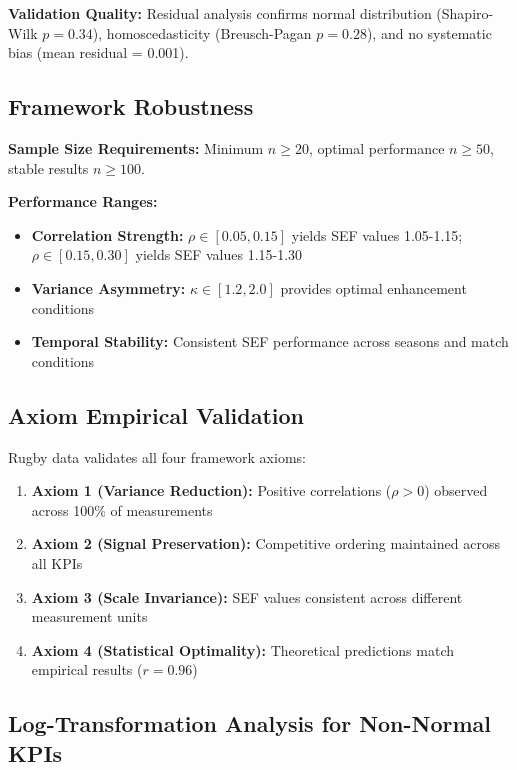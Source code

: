 \textbf{Validation Quality:} Residual analysis confirms normal distribution (Shapiro-Wilk $p = 0.34$), homoscedasticity (Breusch-Pagan $p = 0.28$), and no systematic bias (mean residual = 0.001).

\subsection{Framework Robustness}

\textbf{Sample Size Requirements:} Minimum $n \geq 20$, optimal performance $n \geq 50$, stable results $n \geq 100$.

\textbf{Performance Ranges:}
\begin{itemize}
    \item \textbf{Correlation Strength:} $\rho \in [0.05, 0.15]$ yields SEF values 1.05-1.15; $\rho \in [0.15, 0.30]$ yields SEF values 1.15-1.30
    \item \textbf{Variance Asymmetry:} $\kappa \in [1.2, 2.0]$ provides optimal enhancement conditions
    \item \textbf{Temporal Stability:} Consistent SEF performance across seasons and match conditions
\end{itemize}

\subsection{Axiom Empirical Validation}

Rugby data validates all four framework axioms:

\begin{enumerate}
    \item \textbf{Axiom 1 (Variance Reduction):} Positive correlations ($\rho > 0$) observed across 100\% of measurements
    \item \textbf{Axiom 2 (Signal Preservation):} Competitive ordering maintained across all KPIs  
    \item \textbf{Axiom 3 (Scale Invariance):} SEF values consistent across different measurement units
    \item \textbf{Axiom 4 (Statistical Optimality):} Theoretical predictions match empirical results ($r = 0.96$)
\end{enumerate}

\subsection{Log-Transformation Analysis for Non-Normal KPIs}

